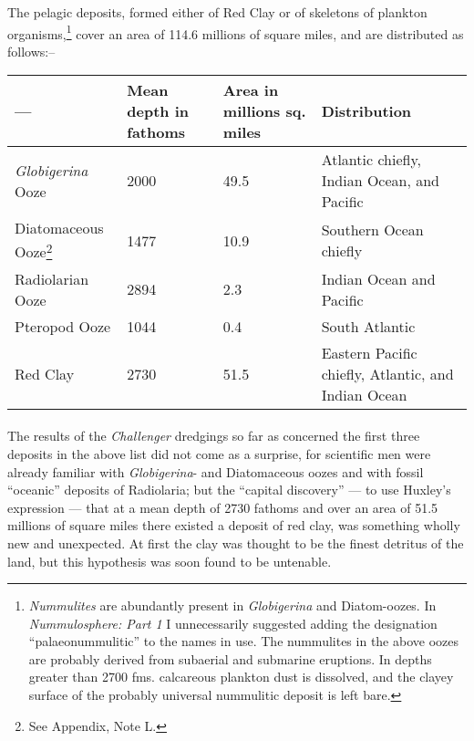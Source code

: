 \documentclass[a4paper, 12pt, oneside]{article}
\begin{document}
The pelagic deposits, formed either of Red Clay or of skeletons of plankton organisms,\footnote{\emph{Nummulites} are abundantly present in \emph{Globigerina} and Diatom-oozes. In \emph{Nummulosphere: Part 1} I unnecessarily suggested adding the designation ``palaeonummulitic'' to the names in use. The nummulites in the above oozes are probably derived from subaerial and submarine eruptions. In depths greater than 2700 fms. calcareous plankton dust is dissolved, and the clayey surface of the probably universal nummulitic deposit is left bare.} cover an area of 114.6 millions of square miles, and are distributed as follows:--
\begin{center}
\begin{tabular}{ |m{9em}|m{4em}|m{4em}|m{12em}| }
 \hline
 --- & Mean depth in fathoms & Area in millions sq. miles & Distribution \\
 \hline
 \emph{Globigerina}\index{Globigerina} Ooze & 2000 & 49.5 & Atlantic\index{Atlantic} chiefly, Indian Ocean, and Pacific \\
 \hline
 Diatomaceous Ooze\footnote{See Appendix, Note L.} & 1477 & 10.9 & Southern Ocean chiefly \\
 \hline
 Radiolarian Ooze & 2894 & 2.3 & Indian Ocean and Pacific \\
 \hline
 Pteropod Ooze & 1044 & 0.4 & South Atlantic\index{Atlantic} \\
 \hline
 Red Clay\index{red clay} & 2730 & 51.5 & Eastern Pacific chiefly, Atlantic\index{Atlantic}, and Indian Ocean \\
 \hline
\end{tabular}
\end{center}
\paragraph{}
The results of the \emph{Challenger} dredgings so far as concerned the first three deposits in the above list did not come as a surprise, for scientific men were already familiar with \emph{Globigerina}- and Diatomaceous oozes and with fossil ``oceanic'' deposits of Radiolaria; but the ``capital discovery'' --- to use Huxley's expression --- that at a mean depth of 2730 fathoms and over an area of 51.5 millions of square miles there existed a deposit of red clay, was something wholly new and unexpected. At first the clay was thought to be the finest detritus of the land, but this hypothesis was soon found to be untenable.
\end{document}
